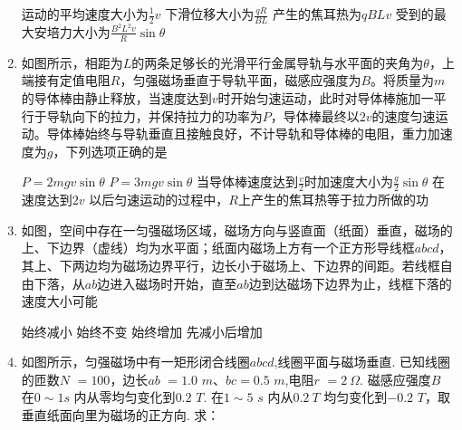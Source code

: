 \begin{enumerate}
\fourchoices
{运动的平均速度大小为$ \frac{ 1 }{ 2 } v $}
{下滑位移大小为$\frac { q R } { B L }$}
{产生的焦耳热为$ qBLv $}
{受到的最大安培力大小为$\frac { B ^ { 2 } L ^ { 2 } v } { R } \sin \theta$}


\item 
{}
如图所示，相距为$ L $的两条足够长的光滑平行金属导轨与水平面的夹角为$ \theta $，上端接有定值电阻$ R $，匀强磁场垂直于导轨平面，磁感应强度为$ B $。将质量为$ m $的导体棒由静止释放，当速度达到$ v $时开始匀速运动，此时对导体棒施加一平行于导轨向下的拉力，并保持拉力的功率为$ P $，导体棒最终以$ 2v $的速度匀速运动。导体棒始终与导轨垂直且接触良好，不计导轨和导体棒的电阻，重力加速度为$ g $，下列选项正确的是  
\begin{figure}[h!]
\centering

\end{figure}


\fourchoices
{$ P=2mgv \sin \theta $}
{$ P=3mgv \sin \theta $}
{当导体棒速度达到$ \frac{v}{2} $时加速度大小为$\frac { g } { 2 } \sin \theta$}
{在速度达到$ 2v $ 以后匀速运动的过程中，$ R $上产生的焦耳热等于拉力所做的功}




\item 
{}
如图，空间中存在一匀强磁场区域，磁场方向与竖直面（纸面）垂直，磁场的上、下边界（虚线）均为水平面；纸面内磁场上方有一个正方形导线框$ abcd $，其上、下两边均为磁场边界平行，边长小于磁场上、下边界的间距。若线框自由下落，从$ ab $边进入磁场时开始，直至$ ab $边到达磁场下边界为止，线框下落的速度大小可能  


\begin{minipage}[h!]{0.7\linewidth}
\vspace{0.3em}
\fourchoices
{始终减小}
{始终不变}
{始终增加}
{先减小后增加}

\vspace{0.3em}
\end{minipage}
\hfill
\begin{minipage}[h!]{0.3\linewidth}
\flushright
\vspace{0.3em}

\vspace{0.3em}
\end{minipage}
\item 
{}
如图所示，匀强磁场中有一矩形闭合线圈$ abcd $,线圈平面与磁场垂直. 已知线圈的匝数$ N $ $ =100 $，边长$ ab $ $ =1.0 $ $ m $、$ bc=0.5 $ $ m $,电阻$ r $ $ =2 \ \Omega .$ 磁感应强度$ B $ 在$ 0 \sim 1 s $ 内从零均匀变化到$ 0.2 $ $ T $. 在$ 1 \sim 5 $ $ s $ 内从$ 0. 2\ T $ 均匀变化到$ -0.2 $ $ T $，取垂直纸面向里为磁场的正方向. 求：
\begin{enumerate}
\renewcommand{\labelenumii}{(\arabic{enumii})}


\end{enumerate}
\end{enumerate}
